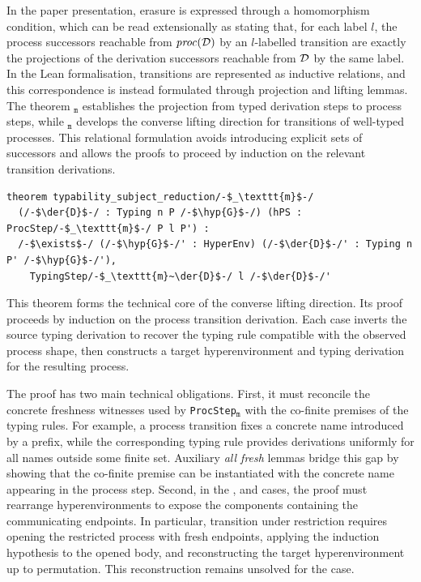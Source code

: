 In the paper presentation, erasure is expressed through a homomorphism condition, which can be read extensionally as stating that, for each label $l$, the process successors reachable from $\mathit{proc}(\mathcal{D})$ by an $l$-labelled transition are exactly the projections of the derivation successors reachable from $\mathcal{D}$ by the same label. In the Lean formalisation, transitions are represented as inductive relations, and this correspondence is instead formulated through projection and lifting lemmas. The theorem $_{\texttt{m}}$ establishes the projection from typed derivation steps to process steps, while $_{\texttt{m}}$ develops the converse lifting direction for transitions of well-typed processes. This relational formulation avoids introducing explicit sets of successors and allows the proofs to proceed by induction on the relevant transition derivations.

\begin{lstlisting}[language=Lean4]
theorem typability_subject_reduction/-$_\texttt{m}$-/
  (/-$\der{D}$-/ : Typing n P /-$\hyp{G}$-/) (hPS : ProcStep/-$_\texttt{m}$-/ P l P') :
  /-$\exists$-/ (/-$\hyp{G}$-/' : HyperEnv) (/-$\der{D}$-/' : Typing n P' /-$\hyp{G}$-/'),
    TypingStep/-$_\texttt{m}~\der{D}$-/ l /-$\der{D}$-/'
\end{lstlisting}

This theorem forms the technical core of the converse lifting direction. Its proof proceeds by induction on the process transition derivation. Each case inverts the source typing derivation to recover the typing rule compatible with the observed process shape, then constructs a target hyperenvironment and typing derivation for the resulting process.

The proof has two main technical obligations. First, it must reconcile the concrete freshness witnesses used by \texttt{ProcStep}$_\texttt{m}$ with the co-finite premises of the typing rules. For example, a process transition fixes a concrete name introduced by a prefix, while the corresponding typing rule provides derivations uniformly for all names outside some finite set. Auxiliary \emph{all fresh} lemmas bridge this gap by showing that the co-finite premise can be instantiated with the concrete name appearing in the process step. Second, in the ,  and  cases, the proof must rearrange hyperenvironments to expose the components containing the communicating endpoints. In particular, transition under restriction requires opening the restricted process with fresh endpoints, applying the induction hypothesis to the opened body, and reconstructing the target hyperenvironment up to permutation. This reconstruction remains unsolved for the  case.

